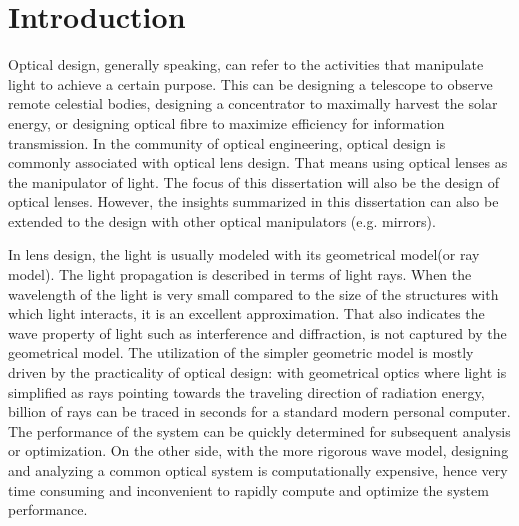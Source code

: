 \chapter{Introduction}
\label{chapter_1_intro}
\graphicspath{ {./chapter-sp/figures/} }
\captionsetup[figure]{labelfont=bf}
\captionsetup{margin=1.5em}
\captionsetup[table]{labelfont=bf}


Optical design, generally speaking, can refer to the activities that manipulate light to achieve a certain purpose. This can be designing a telescope to observe remote celestial bodies, designing a concentrator to maximally harvest the solar energy, or designing optical fibre to maximize efficiency for information transmission. In the community of optical engineering, optical design is commonly associated with optical lens design. That means using optical lenses as the manipulator of light. The focus of this dissertation will also be the design of optical lenses. However, the insights summarized in this dissertation can also be extended to the design with other optical manipulators (e.g. mirrors).

In lens design, the light is usually modeled with its geometrical model(or ray model). The light propagation is described in terms of light rays. When the wavelength of the light is very small compared to the size of the structures with which light interacts, it is an excellent approximation. That also indicates the wave property of light such as interference and diffraction, is not captured by the geometrical model. The utilization of the simpler geometric model is mostly driven by the practicality of optical design: with geometrical optics where light is simplified as rays pointing towards the traveling direction of radiation energy, billion of rays can be traced in seconds for a standard modern personal computer. The performance of the system can be quickly determined for subsequent analysis or optimization. On the other side, with the more rigorous wave model, designing and analyzing a common optical system is computationally expensive, hence very time consuming and inconvenient to rapidly compute and optimize the system performance. 



